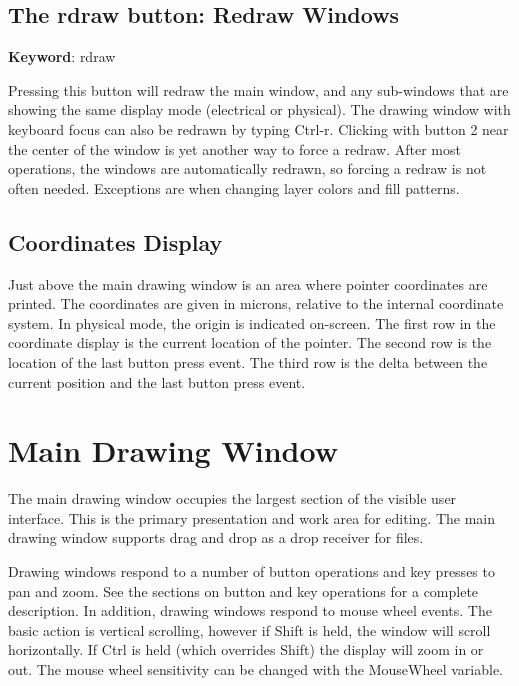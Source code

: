 \subsection{The {\cb rdraw} button: Redraw Windows}

{\bf Keyword}: {\vt rdraw}

Pressing this button will redraw the main window, and any sub-windows
that are showing the same display mode (electrical or physical).  The
drawing window with keyboard focus can also be redrawn by typing {\kb
Ctrl-r}.  Clicking with button 2 near the center of the window is yet
another way to force a redraw.  After most operations, the windows are
automatically redrawn, so forcing a redraw is not often needed. 
Exceptions are when changing layer colors and fill patterns.


\subsection{Coordinates Display}

Just above the {\Xic} main drawing window is an area where
pointer coordinates are printed.  The coordinates are given in
microns, relative to the internal coordinate system.  In physical
mode, the origin is indicated on-screen.  The first row in the
coordinate display is the current location of the pointer.  The second
row is the location of the last button press event.  The third row is
the delta between the current position and the last button press
event.


\section{Main Drawing Window}
The main drawing window occupies the largest section of the visible
user interface.  This is the primary presentation and work area for
editing.  The main drawing window supports drag and drop as a drop
receiver for files.

Drawing windows respond to a number of button operations and key
presses to pan and zoom.  See the sections on button and key
operations for a complete description.  In addition, drawing windows
respond to mouse wheel events.  The basic action is vertical
scrolling, however if {\kb Shift} is held, the window will scroll
horizontally.  If {\kb Ctrl} is held (which overrides {\kb Shift})
the display will zoom in or out.  The mouse wheel sensitivity can be
changed with the {\et MouseWheel} variable.


